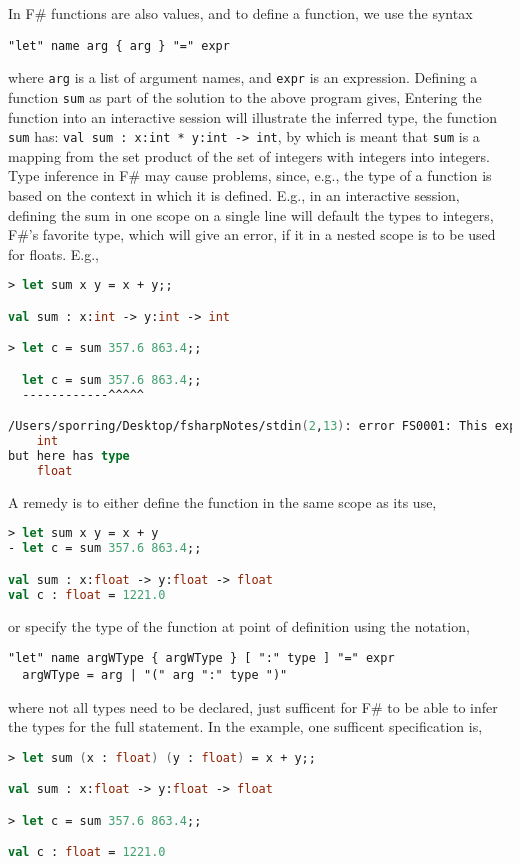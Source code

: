 In F\# functions are also values, and to define a function, we use the syntax
\begin{lstlisting}[language=ebnf]
  "let" name arg { arg } "=" expr
\end{lstlisting}
where \lstinline|arg| is a list of argument names, and \lstinline|expr| is an expression. Defining a function \lstinline|sum| as part of the solution to the above program gives,
Entering the function into an interactive session will illustrate the inferred type, the function \lstinline|sum| has: \lstinline{val sum : x:int * y:int -> int}, by which is meant that \lstinline|sum| is a mapping from the set product of the set of integers with integers into integers. Type inference in F\# may cause problems, since, e.g., the type of a function is based on the context in which it is defined. E.g., in an interactive session, defining the sum in one scope on a single line will default the types to integers, F\#'s favorite type, which will give an error, if it in a nested scope is to be used for floats. E.g.,
\begin{lstlisting}[language=fsharp,caption=fsharpi]
> let sum x y = x + y;;

val sum : x:int -> y:int -> int

> let c = sum 357.6 863.4;;

  let c = sum 357.6 863.4;;
  ------------^^^^^

/Users/sporring/Desktop/fsharpNotes/stdin(2,13): error FS0001: This expression was expected to have type
    int    
but here has type
    float    
\end{lstlisting}
A remedy is to either define the function in the same scope as its use,
\begin{lstlisting}[language=fsharp,caption=fsharpi]
> let sum x y = x + y
- let c = sum 357.6 863.4;;

val sum : x:float -> y:float -> float
val c : float = 1221.0
\end{lstlisting}
or specify the type of the function at point of definition using the notation,
\begin{lstlisting}[language=ebnf]
  "let" name argWType { argWType } [ ":" type ] "=" expr
  argWType = arg | "(" arg ":" type ")"
\end{lstlisting}
where not all types need to be declared, just sufficent for F\# to be able to infer the types for the full statement. In the example, one sufficent specification is,
\begin{lstlisting}[language=fsharp,caption=fsharpi]
> let sum (x : float) (y : float) = x + y;;

val sum : x:float -> y:float -> float

> let c = sum 357.6 863.4;;

val c : float = 1221.0
\end{lstlisting}
